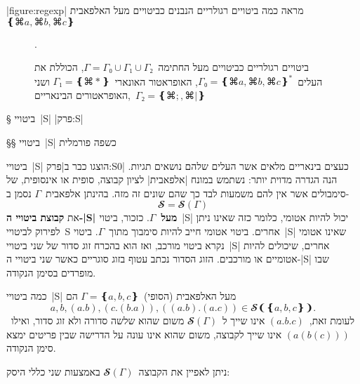 |figure:regexp| מראה כמה ביטויים רגולריים הנבנים כביטויים מעל
האלפאבית~$❴⌘a,⌘b,⌘c❵$
\begin{figure}
  \centering
  \caption[ביטויים רגולריים כביטויים מעל חתיחה]{ביטויים רגולריים כביטויים מעל החתימה~$Γ=Γ₀∪Γ₁∪Γ₂$, הכוללת את
  העלים~$Γ₀=❴⌘a, ⌘b, ⌘c❵^*$, האופראטור האונארי~$Γ₁=❴⌘*❵$ ושני האופראטורים
  הבינאריים,~$Γ₂=❴⌘;,⌘|❵$}.
  \label{figure:regexp}
\end{figure}
§ ביטויי~\E|S|
|פרק:S|

§§ ביטויי~\E|S| כשפה פורמלית

ביטויי~\E|S| הוצגו כבר ב|פרק:S0| כעצים בינאריים מלאים אשר העלים שלהם נושאים
תגיות. הנה הגדרה מדוית יותר: נשתמש במונח \ע|אלפאבית| לציון קבוצה, סופית או
אינסופית, של סימבולים אשר אין להם משמעות לבד כך שהם שונים זה מזה. בהינתן
אלפאבית~$Γ$ נסמן ב- \[
𝓢=𝓢(Γ)
\]
את \textbf{קבוצת ביטויי ה-\E|S| מעל~$Γ$}. כזכור, ביטוי~\E|S|
יכול להיות אטומי, כלומר כזה שאינו ניתן לפירוק לביטויי~S אחרים. ביטוי אטומי חייב
להיות סימבוך מתוך~$Γ$. ביטוי~\E|S| שאינו אטומי נקרא ביטוי מורכב, ואז הוא בהכרח
זוג סדור של שני ביטויי~\E|S| אחרים, שיכולים להיות אטומיים או מורכבים. הזוג
הסדור נכתב עטוף בזוג סוגריים כאשר שני ביטויי ה-\E|S| שבו מופרדים בסימן הנקודה.

כמה ביטויי~\E|S| מעל האלפאבית (הסופי)~$Γ=❴a,b,c❵$ הם \[
  a,b,(a.b),(c.(b.a)),((a.b).(a.c))∈𝓢❨❴a,b,c❵❩.
\] לעומת זאת,~$(a.b.c)$ אינו שייך ל~$𝓢(Γ)$ משום שהוא שלשה סדורה ולא זוג סדור,
ואילו~$(a(b(c)))$ אינו שייך לקבוצה, משום שהוא אינו עונה על הדרישה שבין פריטים
ימצא סימן הנקודה.

ניתן לאפיין את הקבוצה~$𝓢(Γ)$ באמצעות שני כללי היסק:

